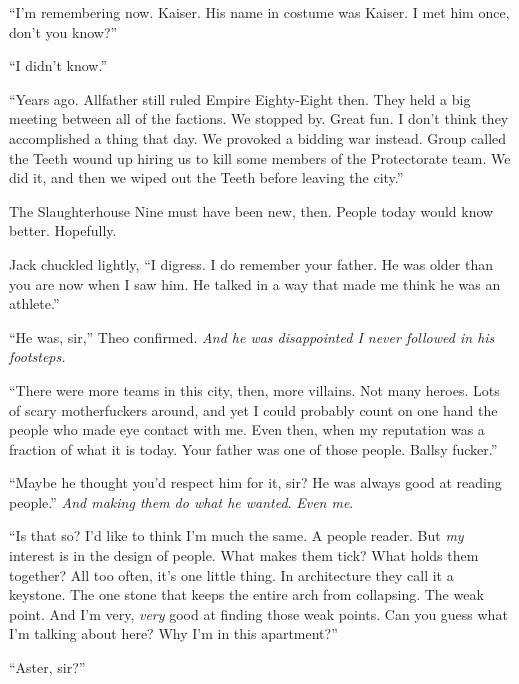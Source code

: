 ``I'm remembering now.  Kaiser.  His name in costume was Kaiser.  I met him once, don't you know?''



``I didn't know.''



``Years ago.  Allfather still ruled Empire Eighty-Eight then.  They held a big meeting between all of the factions.  We stopped by.  Great fun.  I don't think they accomplished a thing that day.  We provoked a bidding war instead.  Group called the Teeth wound up hiring us to kill some members of the Protectorate team.  We did it, and then we wiped out the Teeth before leaving the city.''



The Slaughterhouse Nine must have been new, then.  People today would know better.  Hopefully.



Jack chuckled lightly, ``I digress.  I do remember your father.  He was older than you are now when I saw him.  He talked in a way that made me think he was an athlete.''



``He was, sir,'' Theo confirmed.  \emph{And he was disappointed I never followed in his footsteps.}



``There were more teams in this city, then, more villains.  Not many heroes.  Lots of scary motherfuckers around, and yet I could probably count on one hand the people who made eye contact with me.  Even then, when my reputation was a fraction of what it is today.  Your father was one of those people.  Ballsy fucker.''



``Maybe he thought you'd respect him for it, sir?  He was always good at reading people.''  \emph{And making them do what he wanted}.  \emph{Even me}.



``Is that so?  I'd like to think I'm much the same.  A people reader.  But \emph{my} interest is in the design of people. What makes them tick?  What holds them together?  All too often, it's one little thing.  In architecture they call it a keystone.  The one stone that keeps the entire arch from collapsing.  The weak point.  And I'm very, \emph{very} good at finding those weak points.  Can you guess what I'm talking about here?  Why I'm in this apartment?''



``Aster, sir?''




